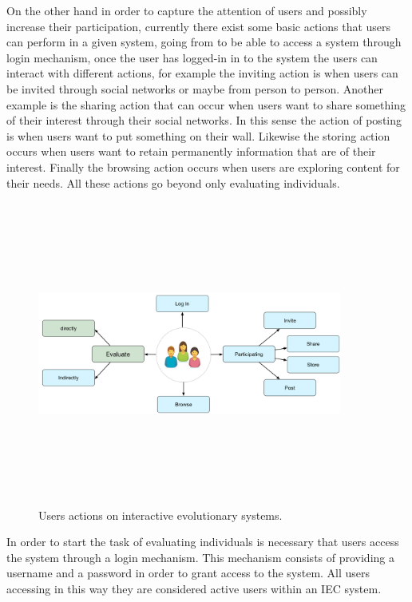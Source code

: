 On the other hand in order to capture the attention of users and possibly
increase their participation, currently there exist some basic actions that
users can perform in a given system, going from to be able to access a system
through login mechanism, once the user has logged-in in to the system the users
can interact with different actions, for example the inviting action is when
users can be invited through social networks or maybe from person to person.
Another example is the sharing action that can occur when users want to share
something of their interest through their social networks. In this sense the
action of posting is when users want to put something on their wall.
Likewise the storing action occurs
when users want to retain permanently information that are of their interest.
Finally the browsing action occurs when users are exploring content for their
needs. All these actions go beyond only evaluating individuals.

\begin{figure}
	\captionsetup{justification=centering,margin=2cm}
	\centering
	\setlength\fboxsep{0pt}
	\setlength\fboxrule{0.7pt}
	\includegraphics[width=10cm,height=10cm,keepaspectratio]{img/users.png}
	\caption{Users actions on interactive evolutionary systems.}
	\label{fig:users}
\end{figure}

In order to start the task of evaluating individuals is necessary that users
access the system through a login mechanism. This mechanism consists of
providing a username and a password in order to grant access to the system. All
users accessing in this way they are considered active users within an IEC
system.

